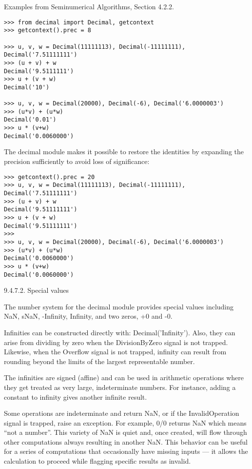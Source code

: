 Examples from Seminumerical Algorithms, Section 4.2.2.

\begin{lstlisting}
>>> from decimal import Decimal, getcontext
>>> getcontext().prec = 8

>>> u, v, w = Decimal(11111113), Decimal(-11111111), Decimal('7.51111111')
>>> (u + v) + w
Decimal('9.5111111')
>>> u + (v + w)
Decimal('10')

>>> u, v, w = Decimal(20000), Decimal(-6), Decimal('6.0000003')
>>> (u*v) + (u*w)
Decimal('0.01')
>>> u * (v+w)
Decimal('0.0060000')
\end{lstlisting}

The decimal module makes it possible to restore the identities by expanding the precision sufficiently to avoid loss of significance:

\begin{lstlisting}
>>> getcontext().prec = 20
>>> u, v, w = Decimal(11111113), Decimal(-11111111), Decimal('7.51111111')
>>> (u + v) + w
Decimal('9.51111111')
>>> u + (v + w)
Decimal('9.51111111')
>>>
>>> u, v, w = Decimal(20000), Decimal(-6), Decimal('6.0000003')
>>> (u*v) + (u*w)
Decimal('0.0060000')
>>> u * (v+w)
Decimal('0.0060000')
\end{lstlisting}


9.4.7.2. Special values

The number system for the decimal module provides special values including NaN, sNaN, -Infinity, Infinity, and two zeros, +0 and -0.

Infinities can be constructed directly with: Decimal('Infinity'). Also, they can arise from dividing by zero when the DivisionByZero signal is not trapped. Likewise, when the Overflow signal is not trapped, infinity can result from rounding beyond the limits of the largest representable number.

The infinities are signed (affine) and can be used in arithmetic operations where they get treated as very large, indeterminate numbers. For instance, adding a constant to infinity gives another infinite result.

Some operations are indeterminate and return NaN, or if the InvalidOperation signal is trapped, raise an exception. For example, 0/0 returns NaN which means “not a number”. This variety of NaN is quiet and, once created, will flow through other computations always resulting in another NaN. This behavior can be useful for a series of computations that occasionally have missing inputs — it allows the calculation to proceed while flagging specific results as invalid.


